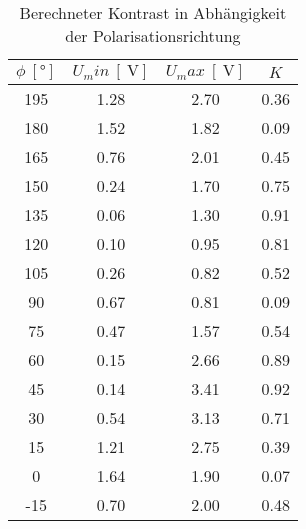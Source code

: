 \begin{table}
[H]
  \centering
\begin{tabular}{cccc}

  \toprule
$\phi \ [\si{\degree}]$ & $U_min \ [\SI{}{\volt}]$ &
$U_max \ [\SI{}{\volt}]$ & $K$ \\
\midrule

195 & \SI{1.28}{} & \SI{2.70}{} & \SI{0.36}{} \\

180 & \SI{1.52}{} & \SI{1.82}{} & \SI{0.09}{} \\

165 & \SI{0.76}{} & \SI{2.01}{} & \SI{0.45}{} \\

150 & \SI{0.24}{} & \SI{1.70}{} & \SI{0.75}{} \\

135 & \SI{0.06}{} & \SI{1.30}{} & \SI{0.91}{} \\

120 & \SI{0.10}{} & \SI{0.95}{} & \SI{0.81}{} \\

105 & \SI{0.26}{} & \SI{0.82}{} & \SI{0.52}{} \\

90  & \SI{0.67}{} & \SI{0.81}{} & \SI{0.09}{} \\

75  & \SI{0.47}{} & \SI{1.57}{} & \SI{0.54}{} \\

60  & \SI{0.15}{} & \SI{2.66}{} & \SI{0.89}{} \\

45  & \SI{0.14}{} & \SI{3.41}{} & \SI{0.92}{} \\

30  & \SI{0.54}{} & \SI{3.13}{} & \SI{0.71}{} \\

15  & \SI{1.21}{} & \SI{2.75}{} & \SI{0.39}{} \\

0   & \SI{1.64}{} & \SI{1.90}{} & \SI{0.07}{} \\

-15 & \SI{0.70}{} & \SI{2.00}{} & \SI{0.48}{} \\

\bottomrule
\end{tabular}

\caption{Berechneter Kontrast in Abhängigkeit der Polarisationsrichtung}
\label{tab:kontrast}
\end{table}

